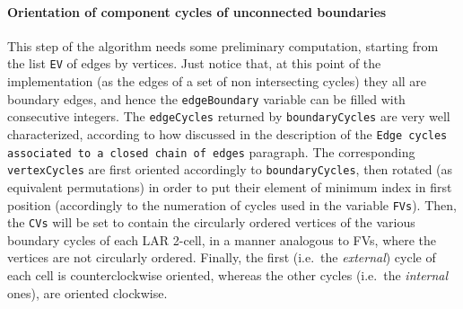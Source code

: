 \documentclass[11pt,oneside]{article}    %
\begin{document}
\paragraph{Orientation of component cycles of unconnected boundaries}

This step of the algorithm needs some preliminary computation, starting from the list \texttt{EV} of edges by vertices. Just notice that, at this point of the implementation (as the edges of a set of non intersecting cycles) they all are boundary edges, and hence the \texttt{edgeBoundary} variable can be filled with consecutive integers. The \texttt{edgeCycles} returned by \texttt{boundaryCycles} are very well characterized, according to how discussed in the description of the \texttt{Edge cycles associated to a closed chain of edges} paragraph.
The corresponding \texttt{vertexCycles} are first oriented accordingly to \texttt{boundaryCycles}, then rotated (as equivalent permutations) in order to put their element of minimum index in first position (accordingly to the numeration of cycles used in the variable \texttt{FVs}). Then, the \texttt{CVs} will be set to contain the circularly ordered vertices of the various boundary cycles of each LAR 2-cell, in a manner analogous to FVs, where the vertices are not circularly ordered. Finally, the first (i.e.~the \emph{external}) cycle of each cell is counterclockwise oriented, whereas the other cycles (i.e.~the \emph{internal} ones), are oriented clockwise.
\end{document}
